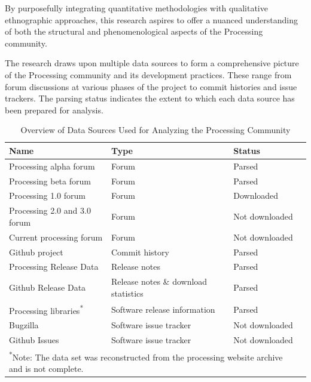 By purposefully integrating quantitative methodologies with qualitative ethnographic approaches, this research aspires to offer a nuanced understanding of both the structural and phenomenological aspects of the Processing community.

The research draws upon multiple data sources to form a comprehensive picture of the Processing community and its development practices. These range from forum discussions at various phases of the project to commit histories and issue trackers. The parsing status indicates the extent to which each data source has been prepared for analysis. 


%      


\begin{table}[h]
    \small
    \begin{adjustbox}{center}
    \begin{tabular}{l l l c}
        \toprule
        Name & Type & Status \\
        \midrule
        Processing alpha forum & Forum & Parsed \\
        Processing beta forum & Forum & Parsed  \\
        Processing 1.0 forum & Forum & Downloaded \\
        Processing 2.0 and 3.0 forum & Forum  & Not downloaded \\
        Current processing forum & Forum & Not downloaded\\
        Github project & Commit history & Parsed \\
        Processing Release Data & Release notes & Parsed \\
        Github Release Data & Release notes \& download statistics & Parsed \\
        Processing libraries\textsuperscript{*} & Software release information & Parsed \\
        Bugzilla & Software issue tracker & Not downloaded \\
        Github Issues & Software issue tracker & Not downloaded \\
        \bottomrule
        \multicolumn{3}{l}{\footnotesize \textsuperscript{*}Note: The data set was reconstructed from the processing website archive and is not complete.}
    \end{tabular}
    \end{adjustbox}
    \caption{Overview of Data Sources Used for Analyzing the Processing Community}
  \end{table}